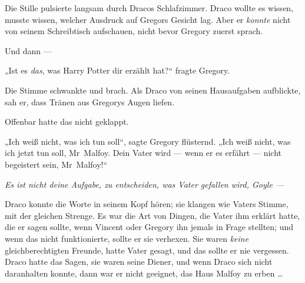 Die Stille pulsierte langsam durch Dracos Schlafzimmer. Draco wollte es wissen, musste wissen, welcher Ausdruck auf Gregors Gesicht lag. Aber er \emph{konnte} nicht von seinem Schreibtisch aufschauen, nicht bevor Gregory zuerst sprach.

Und dann —

„Ist es \emph{das}, was Harry Potter dir erzählt hat?“ fragte Gregory.

Die Stimme schwankte und brach. Als Draco von seinen Hausaufgaben aufblickte, sah er, dass Tränen aus Gregorys Augen liefen.

Offenbar hatte das nicht geklappt.

„Ich weiß nicht, was ich tun soll“, sagte Gregory flüsternd.
„Ich weiß nicht, was ich jetzt tun soll, Mr~Malfoy. Dein Vater wird — wenn er es erfährt — nicht begeistert sein, Mr~Malfoy!“

\emph{Es ist nicht \emph{deine} Aufgabe, zu entscheiden, was Vater gefallen wird, Goyle —}

Draco konnte die Worte in seinem Kopf hören; sie klangen wie Vaters Stimme, mit der gleichen Strenge. Es war die Art von Dingen, die Vater ihm erklärt hatte, die er sagen sollte, wenn Vincent oder Gregory ihn jemals in Frage stellten; und wenn das nicht funktionierte, sollte er sie verhexen. Sie waren \emph{keine} gleichberechtigten Freunde, hatte Vater gesagt, und das sollte er nie vergessen. Draco hatte das Sagen, sie waren seine Diener, und wenn Draco sich nicht daranhalten konnte, dann war er nicht geeignet, das Haus Malfoy zu erben …

